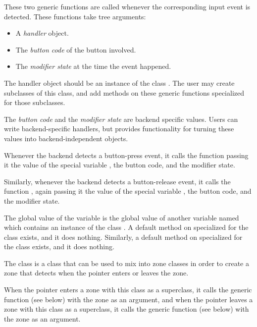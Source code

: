 These two generic functions are called whenever the corresponding
input event is detected.  These functions take tree arguments:

\begin{itemize}
\item A \emph{handler} object.
\item The \emph{button code} of the button involved.
\item The \emph{modifier state} at the time the event happened.
\end{itemize}

The handler object should be an instance of the class
.  The user may create subclasses of this class,
and add methods on these generic functions specialized for those
subclasses.

The \emph{button code} and the \emph{modifier state} are backend
specific values.  Users can write backend-specific handlers, but
\clim{} provides functionality for turning these values into
backend-independent objects. 

Whenever the backend detects a button-press event, it calls the function
 passing it the value of the special variable
, the button code, and the modifier state. 

Similarly, whenever the backend detects a button-release event, it calls
the function , again passing it the value of
the special variable , the button code, and the
modifier state.

The global value of the variable  is the global
value of another variable named  which
contains an instance of the class .  A
default method on  specialized for the
 class exists, and it does nothing.  Similarly,
a default method on  specialized for the
 class exists, and it does nothing.


The  class is a class that can be used to mix into zone
classes in order to create a zone that detects when the pointer enters
or leaves the zone.  

When the pointer enters a zone with this class as a superclass, it
calls the generic function  (see below) with the zone as
an argument, and when the pointer leaves a zone with this class as a
superclass, it calls the generic function  (see below)
with the zone as an argument.

